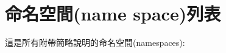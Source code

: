 \section{命名空間(name space)列表}
這是所有附帶簡略說明的命名空間(namespaces)\+:\begin{DoxyCompactList}
\item{}
\end{DoxyCompactList}
